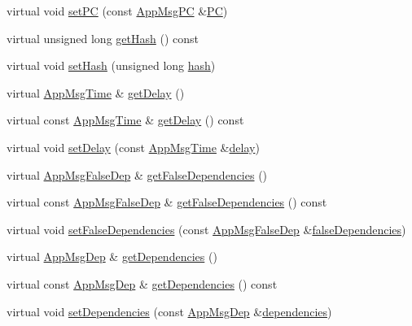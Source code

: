\begin{DoxyCompactItemize}
virtual void \hyperlink{classAppMsg_a36ed2ccb047c20c26292687c44acd79b}{set\+PC} (const \hyperlink{AppMsg__m_8h_abcd76636e4b750d033ffc348601dd7a2}{App\+Msg\+PC} \&\hyperlink{classAppMsg_a0dceb6642736a90673422df92ab3d788}{PC})
\item 
virtual unsigned long \hyperlink{classAppMsg_a59f818e49bf28c2fd494e6668ef13367}{get\+Hash} () const
\item 
virtual void \hyperlink{classAppMsg_afd406d5bf0b92892a1ebf8fe3397331a}{set\+Hash} (unsigned long \hyperlink{classAppMsg_a8b73e331d42d97d9e51603dc5352307f}{hash})
\item 
virtual \hyperlink{AppMsg__m_8h_afd955b091e7d9b98cff80a090db1eb09}{App\+Msg\+Time} \& \hyperlink{classAppMsg_aa45e97cdd014921d271665e856c642cc}{get\+Delay} ()
\item 
virtual const \hyperlink{AppMsg__m_8h_afd955b091e7d9b98cff80a090db1eb09}{App\+Msg\+Time} \& \hyperlink{classAppMsg_ac735d5e96a9c7fe0281d617820d7b533}{get\+Delay} () const
\item 
virtual void \hyperlink{classAppMsg_a81ed720c6233e90a97ab0dd928be6574}{set\+Delay} (const \hyperlink{AppMsg__m_8h_afd955b091e7d9b98cff80a090db1eb09}{App\+Msg\+Time} \&\hyperlink{classAppMsg_af7a10648a9051ad068c0b2660c7bb545}{delay})
\item 
virtual \hyperlink{AppMsg__m_8h_a2b8cadfd13c916ddccf5a213ca34d8ee}{App\+Msg\+False\+Dep} \& \hyperlink{classAppMsg_a0578104e6c8983ba88270192b263e3c9}{get\+False\+Dependencies} ()
\item 
virtual const \hyperlink{AppMsg__m_8h_a2b8cadfd13c916ddccf5a213ca34d8ee}{App\+Msg\+False\+Dep} \& \hyperlink{classAppMsg_aa9c4237b7fafc07ee9ba6d798941cc06}{get\+False\+Dependencies} () const
\item 
virtual void \hyperlink{classAppMsg_ab810112cdc978f6c93b2d45e4aa6f094}{set\+False\+Dependencies} (const \hyperlink{AppMsg__m_8h_a2b8cadfd13c916ddccf5a213ca34d8ee}{App\+Msg\+False\+Dep} \&\hyperlink{classAppMsg_a2e1c93236ae4ceb0fc5571a5b044c454}{false\+Dependencies})
\item 
virtual \hyperlink{AppMsg__m_8h_a39bb58326d7e24febcd7397c022ada6a}{App\+Msg\+Dep} \& \hyperlink{classAppMsg_ae767d2a50a7b279bdecf457fd047125a}{get\+Dependencies} ()
\item 
virtual const \hyperlink{AppMsg__m_8h_a39bb58326d7e24febcd7397c022ada6a}{App\+Msg\+Dep} \& \hyperlink{classAppMsg_a453ca3d6502f7f82020c7ef2787a45c7}{get\+Dependencies} () const
\item 
virtual void \hyperlink{classAppMsg_a1f648f7d16c4f3329fffb6b4e73e969c}{set\+Dependencies} (const \hyperlink{AppMsg__m_8h_a39bb58326d7e24febcd7397c022ada6a}{App\+Msg\+Dep} \&\hyperlink{classAppMsg_a6f78bb134b9a39321ad8093da19d8c8b}{dependencies})
\end{DoxyCompactItemize}
